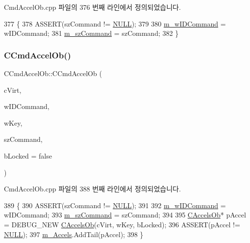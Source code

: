 Cmd\+Accel\+Ob.\+cpp 파일의 376 번째 라인에서 정의되었습니다.


\begin{DoxyCode}
377 \{
378   ASSERT(szCommand != \mbox{\hyperlink{getopt1_8c_a070d2ce7b6bb7e5c05602aa8c308d0c4}{NULL}});
379 
380   \mbox{\hyperlink{class_c_cmd_accel_ob_aa3eb02dcd39ff14763fdefd8fabd7591}{m\_wIDCommand}} = wIDCommand;
381   \mbox{\hyperlink{class_c_cmd_accel_ob_acbd02cc68d3909b1e39b687e76f45d91}{m\_szCommand}} = szCommand;
382 \}
\end{DoxyCode}
\mbox{\label{class_c_cmd_accel_ob_a2c532e999fa7dcb99d7d9b1027cebbef}} 
\subsubsection{\texorpdfstring{C\+Cmd\+Accel\+Ob()}{CCmdAccelOb()}\hspace{0.1cm}{\footnotesize\ttfamily [3/3]}}
{\footnotesize\ttfamily C\+Cmd\+Accel\+Ob\+::\+C\+Cmd\+Accel\+Ob (\begin{DoxyParamCaption}\item[{B\+Y\+TE}]{c\+Virt,  }\item[{W\+O\+RD}]{w\+I\+D\+Command,  }\item[{W\+O\+RD}]{w\+Key,  }\item[{L\+P\+C\+T\+S\+TR}]{sz\+Command,  }\item[{bool}]{b\+Locked = {\ttfamily false} }\end{DoxyParamCaption})}



Cmd\+Accel\+Ob.\+cpp 파일의 388 번째 라인에서 정의되었습니다.


\begin{DoxyCode}
389 \{
390   ASSERT(szCommand != \mbox{\hyperlink{getopt1_8c_a070d2ce7b6bb7e5c05602aa8c308d0c4}{NULL}});
391   
392   \mbox{\hyperlink{class_c_cmd_accel_ob_aa3eb02dcd39ff14763fdefd8fabd7591}{m\_wIDCommand}} = wIDCommand;
393   \mbox{\hyperlink{class_c_cmd_accel_ob_acbd02cc68d3909b1e39b687e76f45d91}{m\_szCommand}} = szCommand;
394   
395   \mbox{\hyperlink{class_c_accels_ob}{CAccelsOb}}* pAccel = DEBUG\_NEW \mbox{\hyperlink{class_c_accels_ob}{CAccelsOb}}(cVirt, wKey, bLocked);
396   ASSERT(pAccel != \mbox{\hyperlink{getopt1_8c_a070d2ce7b6bb7e5c05602aa8c308d0c4}{NULL}});
397   \mbox{\hyperlink{class_c_cmd_accel_ob_a85772f1ea9204af42b8a39a0135dc0f8}{m\_Accels}}.AddTail(pAccel);
398 \}
\end{DoxyCode}
\mbox{\label{class_c_cmd_accel_ob_a41d00fee4f058c03fa85630612e1ab69}} 
